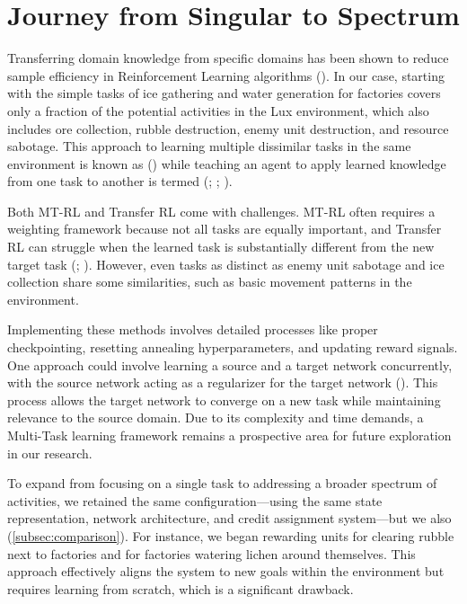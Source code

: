 \section{Journey from Singular to Spectrum}
\label{ch:disc-singular-to-spectrum}

\noindent Transferring domain knowledge from specific domains has been shown to reduce sample efficiency in Reinforcement Learning algorithms (\cite{huang2023robust}). In our case, starting with the simple tasks of ice gathering and water generation for factories covers only a fraction of the potential activities in the Lux environment, which also includes ore collection, rubble destruction, enemy unit destruction, and resource sabotage. This approach to learning multiple dissimilar tasks in the same environment is known as  (\cite{electronics9091363}) while teaching an agent to apply learned knowledge from one task to another is termed  (\cite{Lazaric2012}; \cite{TFLearning}; \cite{10172347}).

\bigskip

\noindent Both MT-RL and Transfer RL come with challenges. MT-RL often requires a weighting framework because not all tasks are equally important, and Transfer RL can struggle when the learned task is substantially different from the new target task (\cite{deramo2024sharing}; \cite{brunskill2013sample}). However, even tasks as distinct as enemy unit sabotage and ice collection share some similarities, such as basic movement patterns in the environment.

\bigskip

\noindent Implementing these methods involves detailed processes like proper checkpointing, resetting annealing hyperparameters, and updating reward signals. One approach could involve learning a source and a target network concurrently, with the source network acting as a regularizer for the target network (\cite{huang2023robust}). This process allows the target network to converge on a new task while maintaining relevance to the source domain. Due to its complexity and time demands, a Multi-Task learning framework remains a prospective area for future exploration in our research.

\bigskip

\noindent To expand from focusing on a single task to addressing a broader spectrum of activities, we retained the same configuration—using the same state representation, network architecture, and credit assignment system—but we also  (\autoref{subsec:comparison}). For instance, we began rewarding units for clearing rubble next to factories and for factories watering lichen around themselves. This approach effectively aligns the system to new goals within the environment but requires learning from scratch, which is a significant drawback.

